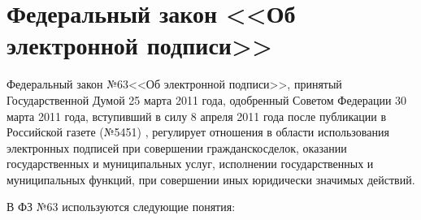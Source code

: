 \section{Федеральный закон <<Об электронной подписи>>} \label{rights_63}

Федеральный закон №63 <<Об электронной подписи>>, принятый Государственной Думой 25 марта 2011 года, одобренный Советом Федерации 30 марта 2011 года, вступивший в силу 8 апреля 2011 года после публикации в Российской газете (№5451) \cite{rg-63fz}, регулирует отношения  в области использования электронных подписей при совершении гражданско сделок, оказании государственных и муниципальных услуг, исполнении государственных и муниципальных функций, при совершении иных юридически значимых действий.

\vspace{\baselineskip}
В ФЗ №63 используются следующие понятия:
